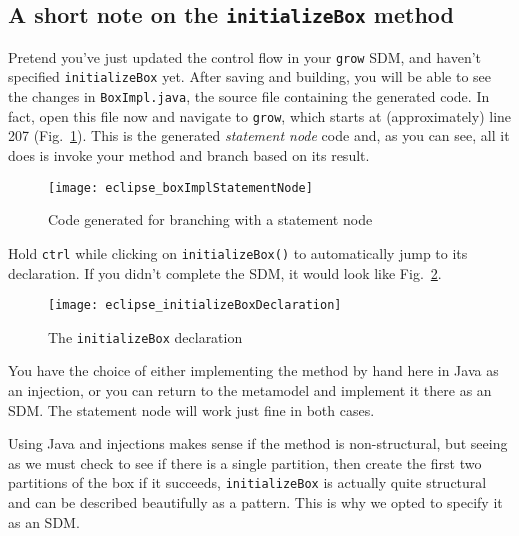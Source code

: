 \newpage
\hypertarget{initialize notes}{}
\subsection{A short note on the \texttt{initializeBox} method}
\genHeader

Pretend you've just updated the control flow in your \texttt{grow} SDM, and haven't specified \texttt{initializeBox} yet. After saving and building, you will be
able to see the changes in \texttt{BoxImpl.java}, the source file containing the generated code. In fact, open this file now and navigate to \texttt{grow},
which starts at (approximately) line 207 (Fig.~\ref{fig:initBoxImpl}). This is the generated \emph{statement node} code and, as you can see, all it does is
invoke your method and branch based on its result. 

\begin{figure}[htp]
\begin{center}
  \texttt{[image: eclipse\_boxImplStatementNode]}
  \caption{Code generated for branching with a statement node}
  \label{fig:initBoxImpl}
\end{center}
\end{figure}

Hold \texttt{ctrl} while clicking on \texttt{initializeBox()} to automatically jump to its declaration. If you didn't complete the SDM, it
would look like Fig.~\ref{fig:initBoxDecl}.

\begin{figure}[htp]
\begin{center}
  \texttt{[image: eclipse\_initializeBoxDeclaration]}
  \caption{The \texttt{initializeBox} declaration}
  \label{fig:initBoxDecl}
\end{center}
\end{figure}

You have the choice of either implementing the method by hand here in Java as an injection, or you can return to the metamodel and implement it there as an SDM.
The statement node will work just fine in both cases.

Using Java and injections makes sense if the method is non-structural, but seeing as we must check to see if there is a single partition, then create the
first two partitions of the box if it succeeds, \texttt{initializeBox} is actually quite structural and can be described beautifully as a pattern. This is why
we opted to specify it as an SDM.

